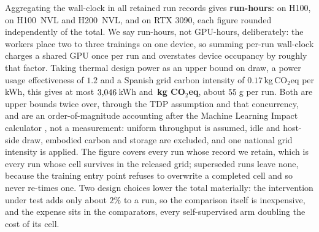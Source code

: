  Aggregating the wall-clock in all \computeRuns{} retained run records gives
\textbf{\computeGpuHours{} run-hours}: \computeHhundred{} on H100,
\computeNvl{} on H100~NVL and H200~NVL, and \computeAmpere{} on RTX 3090,
each figure rounded independently of the total. We
say run-hours, not GPU-hours, deliberately: the workers place two to three
trainings on one device, so summing per-run wall-clock charges a shared GPU
once per run and overstates device occupancy by roughly that factor. Taking
thermal design power as an upper bound on draw, a power usage effectiveness of
$1.2$ and a Spanish grid carbon intensity of $0.17$\,kg\,CO$_2$eq per kWh, this
gives at most $3{,}046$\,kWh and \textbf{\computeCarbon\,kg CO$_2$eq},
about $55$\,g per run. Both are upper bounds twice over, through
the TDP assumption and that concurrency, and are an order-of-magnitude
accounting after the Machine Learning Impact calculator
\citep{lacoste2019quantifying}, not a measurement: uniform throughput is
assumed, idle and host-side draw, embodied carbon and storage are excluded,
and one national grid intensity is applied.
The figure covers every run whose record we retain, which is every run whose
cell survives in the released grid; superseded runs leave none, because the
training entry point refuses to overwrite a completed cell and so never
re-times one. Two design choices lower the total materially: the intervention under
test adds only about $2\%$ to a run, so the comparison itself is inexpensive,
and the expense sits in the comparators, every self-supervised arm doubling the
cost of its cell.

